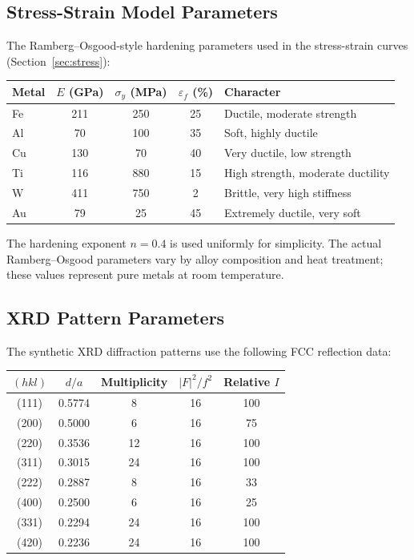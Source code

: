 \documentclass[11pt,a4paper]{article}
\begin{document}
\subsection{Stress-Strain Model Parameters}

The Ramberg--Osgood-style hardening parameters used in the stress-strain
curves (Section~\ref{sec:stress}):

\begin{center}
\begin{tabular}{lcccl}
\toprule
\textbf{Metal} & \textbf{$E$ (GPa)} & \textbf{$\sigma_y$ (MPa)}
  & \textbf{$\varepsilon_f$ (\%)} & \textbf{Character} \\
\midrule
Fe & 211 & 250 & 25 & Ductile, moderate strength \\
Al & 70  & 100 & 35 & Soft, highly ductile \\
Cu & 130 & 70  & 40 & Very ductile, low strength \\
Ti & 116 & 880 & 15 & High strength, moderate ductility \\
W  & 411 & 750 & 2  & Brittle, very high stiffness \\
Au & 79  & 25  & 45 & Extremely ductile, very soft \\
\bottomrule
\end{tabular}
\end{center}

\noindent The hardening exponent $n = 0.4$ is used uniformly for
simplicity.  The actual Ramberg--Osgood parameters vary by alloy
composition and heat treatment; these values represent pure metals at
room temperature.

\subsection{XRD Pattern Parameters}

The synthetic XRD diffraction patterns use the following FCC reflection
data:

\begin{center}
\begin{tabular}{ccccc}
\toprule
\textbf{$(hkl)$} & \textbf{$d/a$} & \textbf{Multiplicity}
  & \textbf{$|F|^2/f^2$} & \textbf{Relative $I$} \\
\midrule
(111) & 0.5774 & 8  & 16 & 100 \\
(200) & 0.5000 & 6  & 16 & 75 \\
(220) & 0.3536 & 12 & 16 & 100 \\
(311) & 0.3015 & 24 & 16 & 100 \\
(222) & 0.2887 & 8  & 16 & 33 \\
(400) & 0.2500 & 6  & 16 & 25 \\
(331) & 0.2294 & 24 & 16 & 100 \\
(420) & 0.2236 & 24 & 16 & 100 \\
\bottomrule
\end{tabular}
\end{center}
\end{document}
